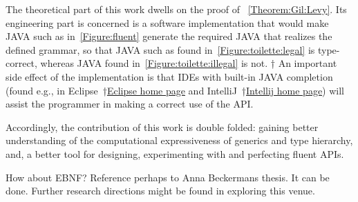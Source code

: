 The theoretical part of this work dwells on the proof of
~\cref{Theorem:Gil:Levy}.
Its engineering part is concerned is
  a software implementation that would make JAVA
  such as in~\cref{Figure:fluent} generate
  the required \Java JAVA that realizes the
  defined grammar, so that JAVA such as
  found in~\cref{Figure:toilette:legal} is type-correct,
  whereas JAVA found in~\cref{Figure:toilette:illegal} is not.
†{%
An important side effect of the implementation is that IDEs with built-in JAVA
completion
 (found e.g., in Eclipse~†{\href{http://www.eclipse.org/}{Eclipse home page}} and IntelliJ~†{\href{https://www.jetbrains.com/idea/}{Intellij home page}})
 will assist the programmer in making a correct use of the API.
 }

Accordingly, the contribution of this work is double folded:
  gaining better understanding of the computational expressiveness of
  \Java generics and type hierarchy, and, a better tool
  for designing, experimenting with and perfecting fluent APIs.

How about EBNF? Reference perhaps to Anna Beckermans thesis.\cite{Tomer:also try to trace citations from wikipedia}
It can be done. Further research directions might be found in exploring this venue. 
